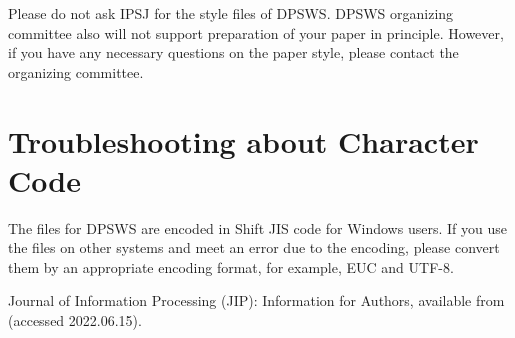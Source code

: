 \documentclass[techreq,english]{dpsws}
\begin{document}
Please do not ask IPSJ for the style files of DPSWS. 
DPSWS organizing committee 
also will not support preparation of your paper in principle. 
However, 
if you have any necessary questions on the paper style, 
please contact the organizing committee. 


\section{Troubleshooting about Character Code}

The files for DPSWS are encoded in Shift JIS code for Windows users.
If you use the files on other systems and meet an error due to the encoding, please convert them by an appropriate encoding format, for example, EUC and UTF-8.



\begin{thebibliography}{10}                                                    

Journal of Information Processing (JIP): 
Information for Authors,
available from  (accessed 2022.06.15).

\end{thebibliography}
\end{document}
